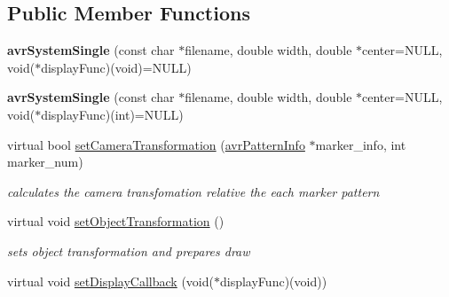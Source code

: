 \subsection*{Public Member Functions}
\begin{DoxyCompactItemize}
\item 
\hypertarget{classavr_system_single_a25777b4804b90f0b07bea81bac2a76ea}{{\bfseries avr\-System\-Single} (const char $\ast$filename, double width, double $\ast$center=N\-U\-L\-L, void($\ast$display\-Func)(void)=N\-U\-L\-L)}\label{classavr_system_single_a25777b4804b90f0b07bea81bac2a76ea}

\item 
\hypertarget{classavr_system_single_a3d1e92b11e29b3a512b57c149f75e0ca}{{\bfseries avr\-System\-Single} (const char $\ast$filename, double width, double $\ast$center=N\-U\-L\-L, void($\ast$display\-Func)(int)=N\-U\-L\-L)}\label{classavr_system_single_a3d1e92b11e29b3a512b57c149f75e0ca}

\item 
\hypertarget{classavr_system_single_a295e942652e83adac2305ce58fe12bdd}{virtual bool \hyperlink{classavr_system_single_a295e942652e83adac2305ce58fe12bdd}{set\-Camera\-Transformation} (\hyperlink{classavr_pattern_info}{avr\-Pattern\-Info} $\ast$marker\-\_\-info, int marker\-\_\-num)}\label{classavr_system_single_a295e942652e83adac2305ce58fe12bdd}

\begin{DoxyCompactList}\small\item\em calculates the camera transfomation relative the each marker pattern \end{DoxyCompactList}\item 
\hypertarget{classavr_system_single_a8b87bd9c86e02427ea210eac6ffc45ea}{virtual void \hyperlink{classavr_system_single_a8b87bd9c86e02427ea210eac6ffc45ea}{set\-Object\-Transformation} ()}\label{classavr_system_single_a8b87bd9c86e02427ea210eac6ffc45ea}

\begin{DoxyCompactList}\small\item\em sets object transformation and prepares draw \end{DoxyCompactList}\item 
\hypertarget{classavr_system_single_a796f9552387f638896c154aee433c511}{virtual void \hyperlink{classavr_system_single_a796f9552387f638896c154aee433c511}{set\-Display\-Callback} (void($\ast$display\-Func)(void))}\label{classavr_system_single_a796f9552387f638896c154aee433c511}


\end{DoxyCompactItemize}
